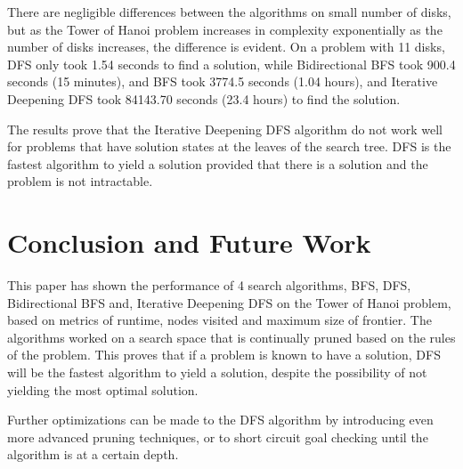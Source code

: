 \documentclass[conference]{IEEEtran}
\begin{document}
There are negligible differences between the algorithms on small number of disks, but as the Tower of Hanoi problem increases in complexity exponentially as the number of disks increases, the difference is evident. On a problem with 11 disks, DFS only took 1.54 seconds to find a solution, while Bidirectional BFS took 900.4 seconds (15 minutes), and BFS took 3774.5 seconds (1.04 hours), and Iterative Deepening DFS took 84143.70 seconds (23.4 hours) to find the solution. 

The results prove that the Iterative Deepening DFS algorithm do not work well for problems that have solution states at the leaves of the search tree. DFS is the fastest algorithm to yield a solution provided that there is a solution and the problem is not intractable.

\section{Conclusion and Future Work}
This paper has shown the performance of 4 search algorithms, BFS, DFS, Bidirectional BFS and, Iterative Deepening DFS on the Tower of Hanoi problem, based on metrics of runtime, nodes visited and maximum size of frontier. The algorithms worked on a search space that is continually pruned based on the rules of the problem. This proves that if a problem is known to have a solution, DFS will be the fastest algorithm to yield a solution, despite the possibility of not yielding the most optimal solution. 

Further optimizations can be made to the DFS algorithm by introducing even more advanced pruning techniques, or to short circuit goal checking until the algorithm is at a certain depth. 


%
\end{document}
